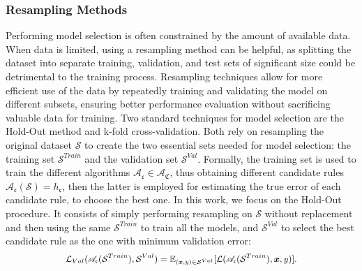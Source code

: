 \subsubsection{Resampling Methods}
Performing model selection is often constrained by the amount of available data.
When data is limited, using a resampling method can be helpful, as splitting the dataset into separate training, validation, and test sets of significant size could be detrimental to the training process.
Resampling techniques allow for more efficient use of the data by repeatedly training and validating the model on different subsets, ensuring better performance evaluation without sacrificing valuable data for training.
Two standard techniques for model selection are the Hold-Out method and k-fold cross-validation.
Both rely on resampling the original dataset $\mathcal{S}$ to create the two essential sets needed for model selection: the training set $\mathcal{S}^{Train}$ and the validation set $\mathcal{S}^{Val}$.
Formally, the training set is used to train the different algorithms $\mathscr{A}_{\mathfrak{c}} \in \mathcal{A}_\mathfrak{C}$, thus obtaining different candidate rules $\mathscr{A}_{\mathfrak{c}}(\mathcal{S}) = h_{\mathfrak{c}}$, then the latter is employed for estimating the true error of each candidate rule, to choose the best one. 
In this work, we focus on the Hold-Out procedure. 
It consists of simply performing resampling on $\mathcal{S}$ without replacement and then using the same $\mathcal{S}^{Train}$ to train all the models, and $\mathcal{S}^{Val}$ to select the best candidate rule as the one with minimum validation error:
\begin{equation} \small%
\begin{split}
     \mathcal{L}_{Val} (\mathscr{A}_{\mathfrak{c}}(\mathcal{S}^{Train}), \mathcal{S}^{Val}) = \mathbb{E}_{(\bm{x},y) \in \mathcal{S}^{Val}}[\mathcal{L}(\mathscr{A}_{\mathfrak{c}}(\mathcal{S}^{Train}), \bm{x},y)].
\end{split}
\end{equation}